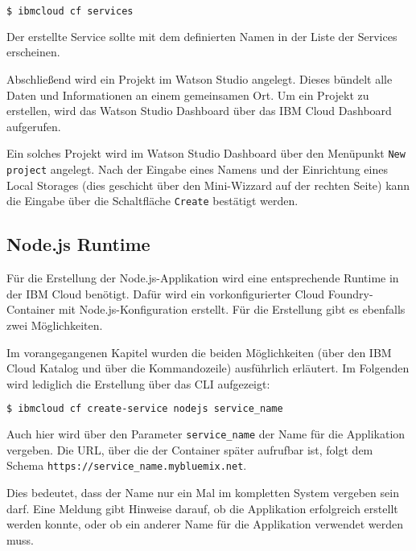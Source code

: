 \begin{lstlisting}[language=bash, caption=Auflisten aller Services in einer Organisation, label=Auflisten aller Services in einer Organisation]
    $ ibmcloud cf services
\end{lstlisting}

Der erstellte Service sollte mit dem definierten Namen in der Liste der Services erscheinen.

Abschließend wird ein Projekt im Watson Studio angelegt. Dieses bündelt alle Daten und Informationen an einem gemeinsamen
Ort. Um ein Projekt zu erstellen, wird das Watson Studio Dashboard über das IBM Cloud Dashboard aufgerufen.

Ein solches Projekt wird im Watson Studio Dashboard über den Menüpunkt \texttt{New project} angelegt. Nach der Eingabe
eines Namens und der Einrichtung eines Local Storages (dies geschicht über den Mini-Wizzard auf der rechten Seite) kann
die Eingabe über die Schaltfläche \texttt{Create} bestätigt werden.

\subsection{Node.js Runtime}
\label{ssc:nodejs_runtime}
Für die Erstellung der Node.js-Applikation wird eine entsprechende Runtime in der IBM Cloud benötigt. Dafür wird ein
vorkonfigurierter Cloud Foundry-Container mit Node.js-Konfiguration erstellt. Für die Erstellung gibt es ebenfalls zwei
Möglichkeiten.

Im vorangegangenen Kapitel wurden die beiden Möglichkeiten (über den IBM Cloud Katalog und über die Kommandozeile)
ausführlich erläutert. Im Folgenden wird lediglich die Erstellung über das CLI aufgezeigt:

\begin{lstlisting}[language=bash, caption=Instanziierung der Node.js Runtime, label=Instanziierung der Node.JS Runtime]
    $ ibmcloud cf create-service nodejs service_name
\end{lstlisting}

Auch hier wird über den Parameter \texttt{service\_name} der Name für die Applikation vergeben. Die URL, über die
der Container später aufrufbar ist, folgt dem Schema \texttt{https://service\_name.mybluemix.net}.

Dies bedeutet, dass der Name nur ein Mal im kompletten System vergeben sein darf. Eine Meldung gibt Hinweise darauf, ob
die Applikation erfolgreich erstellt werden konnte, oder ob ein anderer Name für die Applikation verwendet werden muss.

